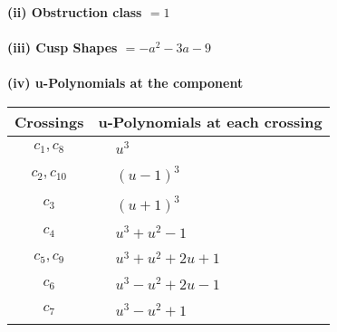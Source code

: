\documentclass[1p]{elsarticle_modified}
\theoremstyle{definition}
\begin{document}
\flushleft \textbf{(ii) Obstruction class $= 1$}\\~\\
\flushleft \textbf{(iii) Cusp Shapes $= - a^2-3 a-9$}\\~\\
\newpage\renewcommand{\arraystretch}{1}
\flushleft \textbf{(iv) u-Polynomials at the component}\newline \\
\begin{tabular}{m{50pt}|m{274pt}}
Crossings & \hspace{64pt}u-Polynomials at each crossing \\
\hline $$\begin{aligned}c_{1},c_{8}\end{aligned}$$&$\begin{aligned}
&u^3
\end{aligned}$\\
\hline $$\begin{aligned}c_{2},c_{10}\end{aligned}$$&$\begin{aligned}
&(u-1)^3
\end{aligned}$\\
\hline $$\begin{aligned}c_{3}\end{aligned}$$&$\begin{aligned}
&(u+1)^3
\end{aligned}$\\
\hline $$\begin{aligned}c_{4}\end{aligned}$$&$\begin{aligned}
&u^3+u^2-1
\end{aligned}$\\
\hline $$\begin{aligned}c_{5},c_{9}\end{aligned}$$&$\begin{aligned}
&u^3+u^2+2 u+1
\end{aligned}$\\
\hline $$\begin{aligned}c_{6}\end{aligned}$$&$\begin{aligned}
&u^3- u^2+2 u-1
\end{aligned}$\\
\hline $$\begin{aligned}c_{7}\end{aligned}$$&$\begin{aligned}
&u^3- u^2+1
\end{aligned}$\\
\hline
\end{tabular}\\~\\
\end{document}
